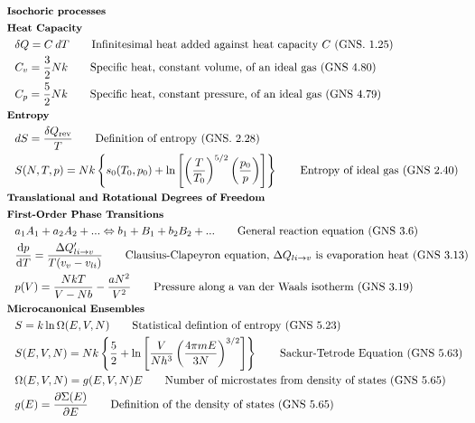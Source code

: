 \documentclass[10pt]{article}
\newcommand{\tder}[2]{\frac{\dd #1}{\dd #2}}
\newcommand{\pder}[2]{\frac{\partial #1}{\partial #2}}
\newcommand{\lrp}[1]{\left( #1 \right)}
\newcommand{\lrb}[1]{\left[ #1 \right]}
\newcommand{\lrc}[1]{\left\{ #1 \right\}}
\begin{document}
\begin{multicols}{2}
\begin{align*}
	& \small \hspace{-7pt} \textbf{Isochoric processes} \small \\
	& \small \hspace{-7pt} \textbf{Heat Capacity} \small \\
		& \delta Q = C \: dT	\tag*{Infinitesimal heat added against heat capacity $C$ (GNS. 1.25)} \\
		& C_v = \frac{3}{2}Nk	\tag*{Specific heat, constant volume, of an ideal gas (GNS 4.80)} \\
		& C_p = \frac{5}{2}Nk	\tag*{Specific heat, constant pressure, of an ideal gas (GNS 4.79)} \\
	& \small \hspace{-7pt} \textbf{Entropy} \small \\
		& dS =  \frac{\delta Q_{\text{rev}}}{T}	\tag*{Definition of entropy (GNS. 2.28)} \\
		& S(N,T,p) = Nk \lrc{s_0(T_0, p_0) + \ln \lrb{\lrp{\frac{T}{T_0}}^{5/2} \lrp{\frac{p_0}{p}}}}	\tag*{Entropy of ideal gas (GNS 2.40)} \\
	& \small \hspace{-7pt} \textbf{Translational and Rotational Degrees of Freedom} \small \\
	& \small \hspace{-7pt} \textbf{First-Order Phase Transitions} \small \\
		& a_1 A_1 + a_2 A_2 + ... \Leftrightarrow b_1+B_1+b_2 B_2+...	\tag*{General reaction equation (GNS 3.6)} \\
		& \tder{p}{T} = \frac{\Delta Q'_{li \rightarrow v}}{T(v_v-v_{li})}	\tag*{Clausius-Clapeyron equation, $\Delta Q_{li\rightarrow v}$ is evaporation heat (GNS 3.13)} \\
		& p(V) = \frac{NkT}{V- Nb} - \frac{aN^2}{V^2}	\tag*{Pressure along a van der Waals isotherm (GNS 3.19)} \\
	& \small \hspace{-7pt} \textbf{Microcanonical Ensembles} \small \\
		& S = k \ln \Omega(E,V,N)	\tag*{Statistical defintion of entropy (GNS 5.23)} \\
		& S(E,V,N) = Nk \lrc{\frac{5}{2} + \ln \lrb{\frac{V}{N h^3} \lrp{\frac{4 \pi m E}{3N}}^{3/2}}}	\tag*{Sackur-Tetrode Equation (GNS 5.63)} \\
		& \Omega(E,V,N) = g(E,V,N) E	\tag*{Number of microstates from density of states (GNS 5.65)} \\
		& g(E) = \pder{\Sigma(E)}{E}	\tag*{Definition of the density of states (GNS 5.65)} \\

\end{align*}
\end{multicols}
\end{document}
